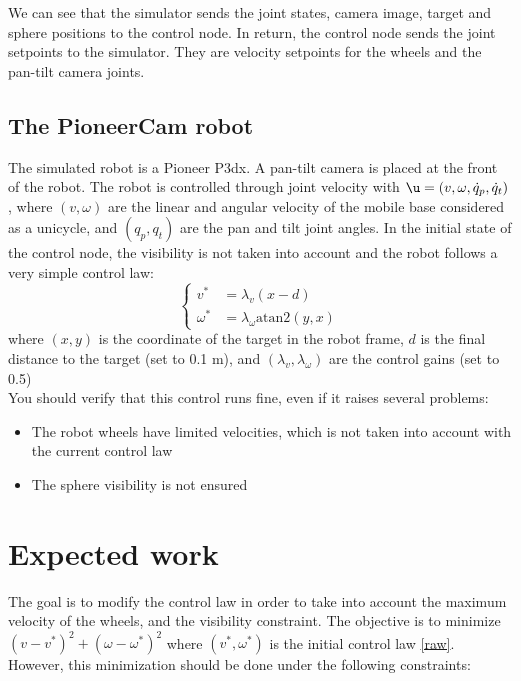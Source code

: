 \documentclass{ecnreport}
\begin{document}
We can see that the simulator sends the joint states, camera image, target and sphere positions to the control node. In return, the control node sends the joint setpoints
to the simulator. They are velocity setpoints for the wheels and the pan-tilt camera joints.\\


\subsection{The PioneerCam robot}

The simulated robot is a Pioneer P3dx. A pan-tilt camera is placed at the front of the robot. The robot is controlled through joint velocity with $\u = (v, \omega, \dot q_p, \dot q_t)$, where $(v,\omega)$ are the linear and angular velocity
of the mobile base considered as a unicycle, and $(q_p, q_t)$ are the pan and tilt joint angles. In the initial state of the control node, the visibility is not taken into account and the robot follows a very simple control law:
\begin{equation}\label{raw}
 \left\{\begin{array}{ll}
         v^* &= \lambda_v(x-d) \\ \omega^* &= \lambda_{\omega}\text{atan2}(y, x)
        \end{array}\right.
\end{equation}where $(x,y)$ is the coordinate of the target in the robot frame, $d$ is the final distance to the target (set to 0.1 m), and $(\lambda_v, \lambda_{\omega})$ are the control gains (set to 0.5)\\

You should verify that this control runs fine, even if it raises several problems:
\begin{itemize}
 \item The robot wheels have limited velocities, which is not taken into account with the current control law
 \item The sphere visibility is not ensured
\end{itemize}


\section{Expected work}

The goal is to modify the control law in order to take into account the maximum velocity of the wheels, and the visibility constraint.
The objective is to minimize $(v-v^*)^2 + (\omega-\omega^*)^2$ where $(v^*,\omega^*)$ is the initial control law \eqref{raw}.
However, this minimization should be done under the following constraints:
\end{document}
